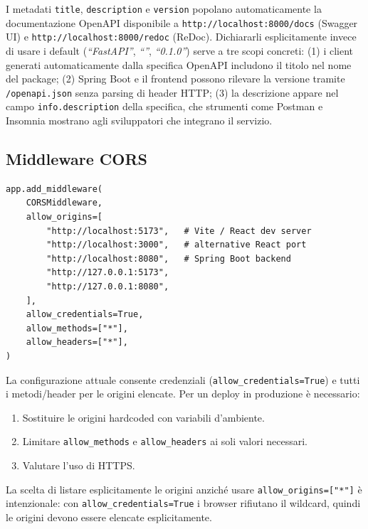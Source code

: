 \documentclass[a4paper,12pt]{article}
\begin{document}
\noindent I metadati \texttt{title}, \texttt{description} e \texttt{version}
popolano automaticamente la documentazione OpenAPI disponibile a
\texttt{http://localhost:8000/docs} (Swagger UI) e
\texttt{http://localhost:8000/redoc} (ReDoc). Dichiararli esplicitamente
invece di usare i default (\textit{``FastAPI''}, \textit{``''}, \textit{``0.1.0''})
serve a tre scopi concreti: (1) i client generati automaticamente dalla
specifica OpenAPI includono il titolo nel nome del package; (2) Spring Boot
e il frontend possono rilevare la versione tramite \texttt{/openapi.json}
senza parsing di header HTTP; (3) la descrizione appare nel campo
\texttt{info.description} della specifica, che strumenti come Postman e
Insomnia mostrano agli sviluppatori che integrano il servizio.

\subsection{Middleware CORS}

\begin{lstlisting}[caption={Configurazione del CORS middleware.}]
app.add_middleware(
    CORSMiddleware,
    allow_origins=[
        "http://localhost:5173",   # Vite / React dev server
        "http://localhost:3000",   # alternative React port
        "http://localhost:8080",   # Spring Boot backend
        "http://127.0.0.1:5173",
        "http://127.0.0.1:8080",
    ],
    allow_credentials=True,
    allow_methods=["*"],
    allow_headers=["*"],
)
\end{lstlisting}

\noindent \begin{warningbox}
La configurazione attuale consente credenziali (\texttt{allow\_credentials=True})
e tutti i metodi/header per le origini elencate. Per un deploy in produzione
\`{e} necessario:
\begin{enumerate}
  \item Sostituire le origini hardcoded con variabili d'ambiente.
  \item Limitare \texttt{allow\_methods} e \texttt{allow\_headers} ai soli
        valori necessari.
  \item Valutare l'uso di HTTPS.
\end{enumerate}
\end{warningbox}

La scelta di listare esplicitamente le origini anzich\'{e} usare
\texttt{allow\_origins=["*"]} \`{e} intenzionale: con
\texttt{allow\_credentials=True} i browser rifiutano il wildcard, quindi
le origini devono essere elencate esplicitamente.
\end{document}
